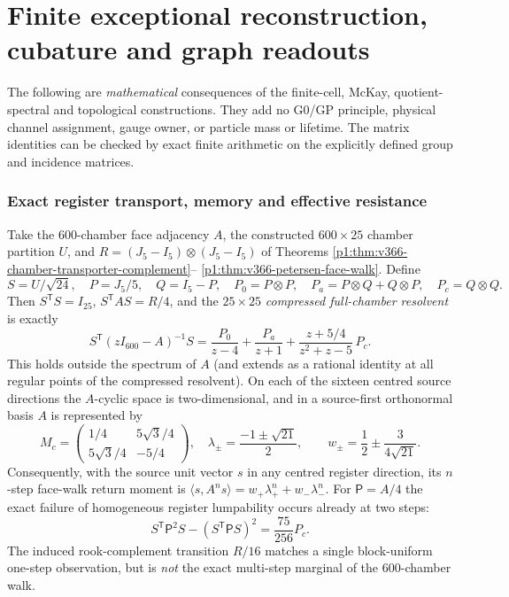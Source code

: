 \documentclass[11pt]{article}
\begin{document}
\clearpage
\part{Finite exceptional reconstruction, cubature and graph readouts}
\label{p1b:part:v16-combined}
The following are \emph{mathematical} consequences of the
finite-cell, McKay, quotient-spectral and topological constructions.
They add no G0/GP principle, physical channel assignment, gauge owner,
or particle mass or lifetime.  The matrix identities can be checked by exact finite arithmetic on
the explicitly defined group and incidence matrices.

\section{Exact register transport, memory and effective resistance}
\label{p1b:sec:v16-transport}
\begin{theorem}
\label{p1b:thm:v16-register-resolvent}
Take the $600$-chamber face adjacency $A$, the constructed
$600\times25$ chamber partition $U$, and
$R=(J_5-I_5)\otimes(J_5-I_5)$ of Theorems
\ref{p1:thm:v366-chamber-transporter-complement}--
\ref{p1:thm:v366-petersen-face-walk}. Define
\[
 S=U/\sqrt{24},\quad P=J_5/5,\quad Q=I_5-P,\quad
 P_0=P\otimes P,\quad
 P_a=P\otimes Q+Q\otimes P,\quad P_c=Q\otimes Q.
\]
Then $S^\mathsf TS=I_{25}$, $S^\mathsf TAS=R/4$, and the
$25\times25$ \emph{compressed full-chamber resolvent} is exactly
\begin{equation}
\boxed{
S^\mathsf T(zI_{600}-A)^{-1}S
 =\frac{P_0}{z-4}+\frac{P_a}{z+1}
 +\frac{z+5/4}{z^2+z-5}\,P_c.}
\tag{T16.1}\label{p1b:eq:v16-register-G}
\end{equation}
This holds outside the spectrum of $A$ (and extends as a rational
identity at all regular points of the compressed resolvent).
On each of the sixteen centred source directions the $A$-cyclic
space is two-dimensional, and in a source-first orthonormal basis
$A$ is represented by
\[
\boxed{M_c=
\begin{pmatrix}
 1/4&5\sqrt3/4\\5\sqrt3/4&-5/4
\end{pmatrix}},\quad
\lambda_\pm=\frac{-1\pm\sqrt{21}}2,
\qquad
w_\pm=\frac12\pm\frac{3}{4\sqrt{21}}.
\]
Consequently, with the source unit vector $s$ in any centred
register direction, its $n$-step face-walk return moment is
$\langle s,A^ns\rangle=w_+\lambda_+^n+w_-\lambda_-^n$.
For $\mathsf P=A/4$ the exact failure of homogeneous register
lumpability occurs already at two steps:
\begin{equation}
\boxed{S^\mathsf T\mathsf P^2S-
             (S^\mathsf T\mathsf P S)^2=\frac{75}{256}P_c.}
\tag{T16.2}\label{p1b:eq:v16-nonlump}
\end{equation}
The induced rook-complement transition $R/16$ matches a single
block-uniform one-step observation, but is \emph{not} the exact
multi-step marginal of the $600$-chamber walk.
\end{theorem}
\end{document}
